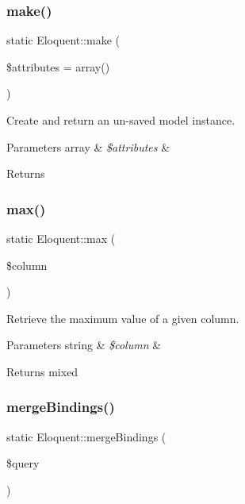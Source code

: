 \subsubsection{\texorpdfstring{make()}{make()}}
{\footnotesize\ttfamily static Eloquent\+::make (\begin{DoxyParamCaption}\item[{}]{\$attributes = {\ttfamily array()} }\end{DoxyParamCaption})\hspace{0.3cm}{\ttfamily [static]}}

Create and return an un-\/saved model instance.


\begin{DoxyParams}[1]{Parameters}
array & {\em \$attributes} & \\
\hline
\end{DoxyParams}
\begin{DoxyReturn}{Returns}

\end{DoxyReturn}
\mbox{\label{class_eloquent_a74732442e996af19bbb46d839a6fddf3}} 
\subsubsection{\texorpdfstring{max()}{max()}}
{\footnotesize\ttfamily static Eloquent\+::max (\begin{DoxyParamCaption}\item[{}]{\$column }\end{DoxyParamCaption})\hspace{0.3cm}{\ttfamily [static]}}

Retrieve the maximum value of a given column.


\begin{DoxyParams}[1]{Parameters}
string & {\em \$column} & \\
\hline
\end{DoxyParams}
\begin{DoxyReturn}{Returns}
mixed 
\end{DoxyReturn}
\mbox{\label{class_eloquent_a590622affbe9e982b13019733af32012}} 
\subsubsection{\texorpdfstring{merge\+Bindings()}{mergeBindings()}}
{\footnotesize\ttfamily static Eloquent\+::merge\+Bindings (\begin{DoxyParamCaption}\item[{}]{\$query }\end{DoxyParamCaption})\hspace{0.3cm}{\ttfamily [static]}}

